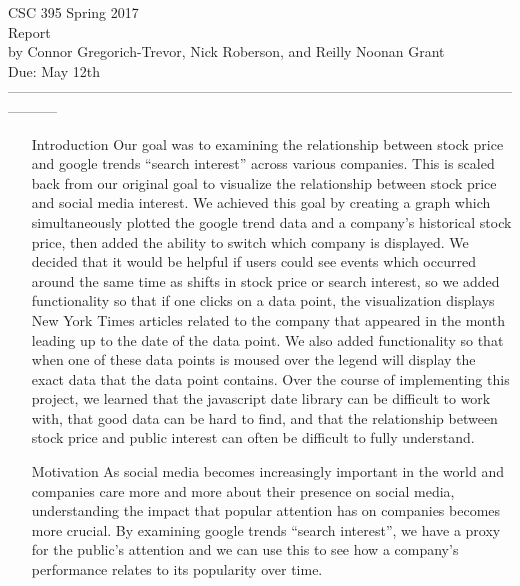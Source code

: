 \documentclass[12pt]{article}
\begin{document}
\begin{center} 
  CSC 395 Spring 2017 \\
  Report\\
  by Connor Gregorich-Trevor, Nick Roberson, and Reilly Noonan Grant\\
  Due: May 12th \\

----------------------------------------------------------------------------------------------------------------------- \end{center}

\begin{enumerate}
\item[Introduction]
Our goal was to examining the relationship between stock price and
google trends ``search interest'' across various companies. This is
scaled back from our original goal to visualize the relationship
between stock price and social media interest. We achieved this goal
by creating a graph which simultaneously plotted the google trend data
and a company's historical stock price, then added the ability to
switch which company is displayed. We decided that it would be helpful
if users could see events which occurred around the same time as
shifts in stock price or search interest, so we added functionality
so that if one clicks on a data point, the visualization displays New
York Times articles related to the company that appeared in the month
leading up to the date of the data point. We also added functionality
so that when one of these data points is moused over the legend will
display the exact data that the data point contains. Over the course
of implementing this project, we learned that the javascript date
library can be difficult  to work with, that good data can be hard to
find, and that the relationship between  stock price and public
interest can often be difficult to fully understand. 
 
\item[Motivation]
As social media becomes increasingly important in the world and
companies care more and more about their presence on social media,
understanding the impact that popular attention has on companies
becomes more crucial. By examining google trends ``search interest'',
we have a proxy for the public's attention and we can use this to see
how a company's performance relates to its popularity over time.  


\end{enumerate}
\end{document}
